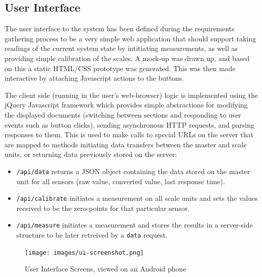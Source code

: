 \subsection{User Interface}
The user interface to the system has been defined during the requirements gathering process to be a very simple web application that should support taking readings of the current system state by intitiating measurements, as well as providing simple calibration of the scales. A mock-up was drawn up, and based on this a static HTML/CSS prototype was generated. This was then made interactive by attaching Javascript actions to the buttons.

The client side (running in the user's web-browser) logic is implemented using the jQuery Javascript framework \cite{jquery} which provides simple abstractions for modifying the displayed documents (switching between sections and responding to user events such as button clicks), sending asynchronous HTTP requests, and parsing responses to them. This is used to make calls to special URLs on the server that are mapped to methods initiating data transfers between the master and scale units, or returning data previously stored on the server:

\begin{itemize}
	\item \texttt{/api/data} returns a JSON \cite{json-spec} object containing the data stored on the master unit for all sensors (raw value, converted value, last response time).
	\item \texttt{/api/calibrate} initiates a measurement on all scale units and sets the values received to be the zero-points for that particular sensor.
	\item \texttt{/api/measure} initiates a measurement and stores the results in a server-side structure to be later retreived by a \texttt{data} request.
\end{itemize}

\begin{figure}
\texttt{[image: images/ui-screenshot.png]}
\label{ui-screenshot}
\caption{User Interface Screens, viewed on an Android phone}
\end{figure}
